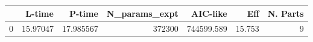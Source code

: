 \begin{tabular}{lrrrrrr}
\toprule
{} &    L-time &     P-time &  N\_params\_expt &    AIC-like &     Eff &  N. Parts \\
\midrule
0 &  15.97047 &  17.985567 &         372300 &  744599.589 &  15.753 &         9 \\
\bottomrule
\end{tabular}
